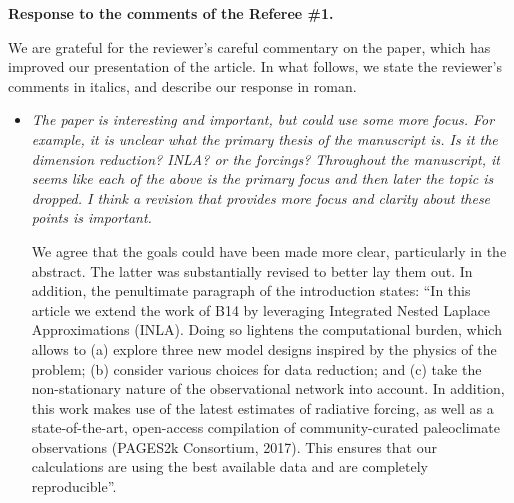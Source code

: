 \documentclass[11pt]{article}
\newcommand{\lb}[1]{\color{ForestGreen}\textbf{[Luis B.: #1]}\normalcolor}
\newcommand{\bl}[1]{\color{red}\textbf{[Bo: #1]}\normalcolor}
\newcommand{\jeg}[1]{\color{blue}\textbf{Julien: #1]}\normalcolor}
\begin{document}
\begin{center}
  {\Large \textbf{Response to the comments of the Referee \#1.}}
\end{center}

We are grateful for the reviewer's careful commentary on the paper, which has improved
our presentation of the article. In what follows, we state the reviewer's
comments in italics, and describe our response in roman.

\begin{itemize}
\item \textit{The paper is interesting and important, but could use some more
focus. For example, it is unclear what the primary thesis of the manuscript is.
Is it the dimension reduction? INLA? or the forcings? Throughout the manuscript,
it seems like each of the above is the primary focus and then later the topic is
dropped. I think a revision that provides more focus and clarity about these
points is important.
}

We agree that the goals could have been made more clear, particularly in the abstract. The latter was substantially revised to better lay them out. In addition, the penultimate paragraph of the introduction states:  ``In this article we extend the work of B14 by leveraging Integrated Nested Laplace Approximations (INLA). Doing so lightens the computational burden, which allows to (a) explore
 three new model designs inspired by the physics of the problem; (b) consider various choices for data reduction; and (c) take the non-stationary nature of the observational network into account. In addition, this work makes use of the latest estimates of radiative forcing, as well as a state-of-the-art, open-access compilation of community-curated paleoclimate observations (PAGES2k Consortium, 2017). This ensures that our calculations are using the best available data and are completely reproducible''.
 

  

\end{itemize}
\end{document}
